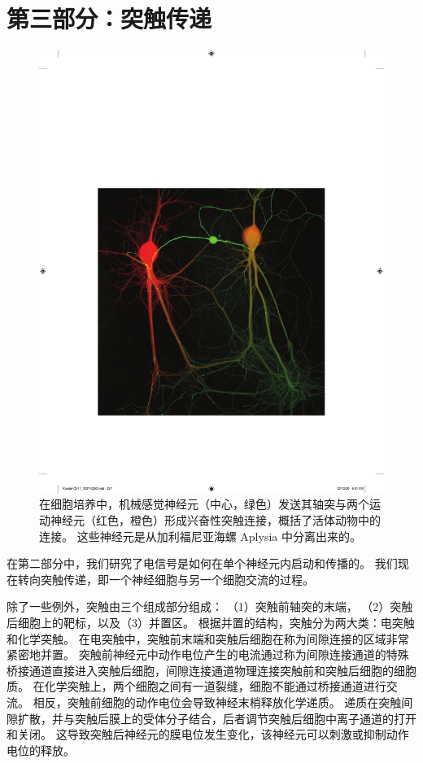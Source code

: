 \chapter*{第三部分：突触传递}

\begin{figure}[htbp]
	\centering
	\includegraphics[width=0.9\linewidth]{chap11/fig_11_0}
	\caption{在细胞培养中，机械感觉神经元（中心，绿色）发送其轴突与两个运动神经元（红色，橙色）形成兴奋性突触连接，概括了活体动物中的连接。
		这些神经元是从加利福尼亚海螺 Aplysia 中分离出来的。}
	\label{fig:11_0}
\end{figure}


在第二部分中，我们研究了电信号是如何在单个神经元内启动和传播的。
我们现在转向突触传递，即一个神经细胞与另一个细胞交流的过程。


除了一些例外，突触由三个组成部分组成：
（1）突触前轴突的末端，
（2）突触后细胞上的靶标，以及（3）并置区。
根据并置的结构，突触分为两大类：电突触和化学突触。
在电突触中，突触前末端和突触后细胞在称为间隙连接的区域非常紧密地并置。
突触前神经元中动作电位产生的电流通过称为间隙连接通道的特殊桥接通道直接进入突触后细胞，间隙连接通道物理连接突触前和突触后细胞的细胞质。
在化学突触上，两个细胞之间有一道裂缝，细胞不能通过桥接通道进行交流。
相反，突触前细胞的动作电位会导致神经末梢释放化学递质。
递质在突触间隙扩散，并与突触后膜上的受体分子结合，后者调节突触后细胞中离子通道的打开和关闭。
这导致突触后神经元的膜电位发生变化，该神经元可以刺激或抑制动作电位的释放。


